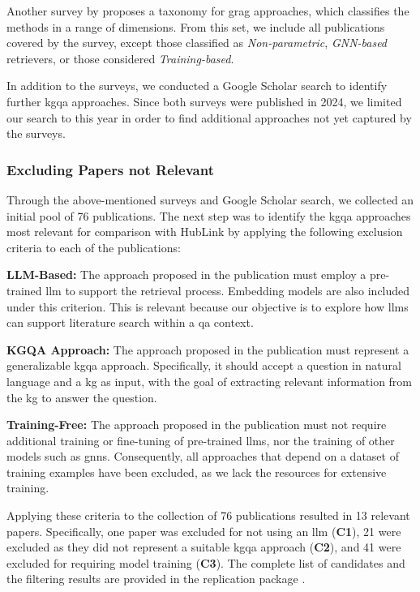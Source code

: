 Another survey by \textcite{peng_graph_2024} proposes a taxonomy for \gls{grag} approaches, which classifies the methods in a range of dimensions. From this set, we include all publications covered by the survey, except those classified as \emph{Non-parametric}, \emph{GNN-based} retrievers, or those considered \emph{Training-based}. 

In addition to the surveys, we conducted a Google Scholar search to identify further \gls{kgqa} approaches. Since both surveys were published in 2024, we limited our search to this year in order to find additional approaches not yet captured by the surveys.


\subsubsection{Excluding Papers not Relevant}

Through the above-mentioned surveys and Google Scholar search, we collected an initial pool of 76 publications. The next step was to identify the \gls{kgqa} approaches most relevant for comparison with HubLink by applying the following exclusion criteria to each of the publications:

\begin{enumerate}[label=\textbf{[C\arabic*]}]
    \item \textbf{LLM-Based:} The approach proposed in the publication must employ a pre-trained \gls{llm} to support the retrieval process. Embedding models are also included under this criterion. This is relevant because our objective is to explore how \glspl{llm} can support literature search within a \gls{qa} context.
    \item \textbf{KGQA Approach:} The approach proposed in the publication must represent a generalizable \gls{kgqa} approach. Specifically, it should accept a question in natural language and a \gls{kg} as input, with the goal of extracting relevant information from the \gls{kg} to answer the question.
    \item \textbf{Training-Free:} The approach proposed in the publication must not require additional training or fine-tuning of pre-trained \glspl{llm}, nor the training of other models such as \glspl{gnn}. Consequently, all approaches that depend on a dataset of training examples have been excluded, as we lack the resources for extensive training.
\end{enumerate}

Applying these criteria to the collection of 76 publications resulted in 13 relevant papers. Specifically, one paper was excluded for not using an \gls{llm} (\textbf{C1}), 21 were excluded as they did not represent a suitable \gls{kgqa} approach (\textbf{C2}), and 41 were excluded for requiring model training (\textbf{C3}). The complete list of candidates and the filtering results are provided in the replication package \cite{schneider_replication_2025}.

